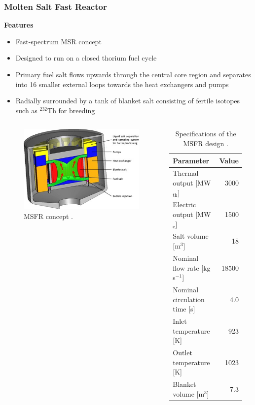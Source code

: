 \begin{frame}
	\frametitle{Molten Salt Fast Reactor}
		\textbf{Features}
		\begin{itemize}
			\item Fast-spectrum \gls{MSR} concept
			\item Designed to run on a closed thorium fuel cycle
			\item Primary fuel salt flows upwards through the central core
			region and separates into 16 smaller external loops towards the
			heat exchangers and pumps
			\item Radially surrounded by a tank of blanket salt consisting of
			fertile isotopes such as $^{232}$Th for breeding
		\end{itemize}
		\begin{columns}
			\column[t]{4cm}
			\begin{figure}
				\includegraphics[width=\textwidth]{../paper/figures/MSFR}
				\caption{\gls{MSFR} concept \cite{serp_molten_2014}.}
			\end{figure}
			\column[t]{6cm}
			{\footnotesize
			\begin{table}[t]
				\caption{\footnotesize Specifications of the \gls{MSFR} design
				\cite{serp_molten_2014}.}
				\begin{tabular}{ l r }
				\hline
				Parameter & Value \\
				\hline
				Thermal output [MW$_{\text{th}}$] & 3000 \\
				Electric output [MW$_{\text{e}}$] & 1500 \\
				Salt volume [m$^3$] & 18 \\
				Nominal flow rate [kg s$^{-1}$] & 18500  \\
				Nominal circulation time [s] & 4.0 \\
				Inlet temperature [K] & 923 \\
				Outlet temperature [K] & 1023 \\
				Blanket volume [m$^3$] & 7.3\\
				\hline
				\end{tabular}
			\label{table:msfr}
			\end{table}
			}
		\end{columns}
\end{frame}